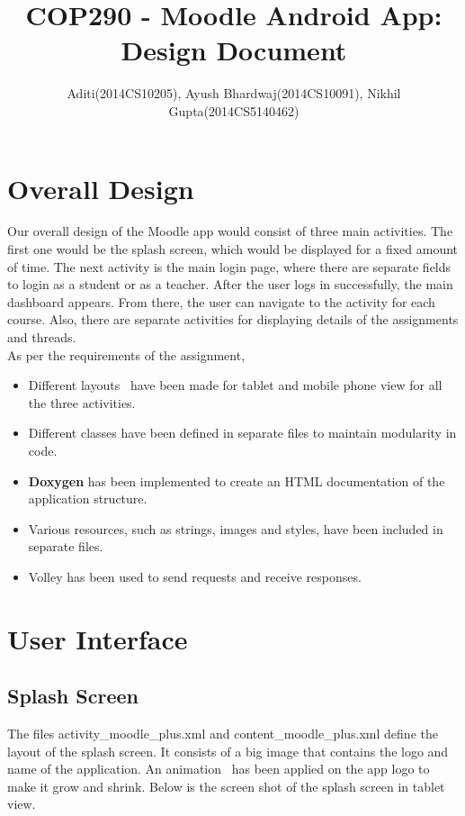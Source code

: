 \documentclass{article}
\begin{document}
\title{COP290 - Moodle Android App: Design Document}
\author{ Aditi(2014CS10205), Ayush Bhardwaj(2014CS10091), Nikhil Gupta(2014CS5140462)}

\maketitle

\section{Overall Design}

Our overall design of the Moodle app would consist of three main activities. The first one would be the splash screen, which would be displayed for a fixed amount of time. The next activity is the main login page, where there are separate fields to login as a student or as a teacher. After the user logs in successfully, the main dashboard appears. From there, the user can navigate to the activity for each course. Also, there are separate activities for displaying details of the assignments and threads.\\
As per the requirements of the assignment,
\begin{itemize}
\item Different layouts~\cite{multiple_screen_sizes} have been made for tablet and mobile phone view for all the three activities.
\item Different classes have been defined in separate files to maintain modularity in code.
\item \textbf{Doxygen} has been implemented to create an HTML documentation of the application structure.
\item Various resources, such as strings, images and styles, have been included in separate files.
\item Volley has been used to send requests and receive responses.
\end{itemize} 

\section{User Interface}
\subsection{Splash Screen} The files activity\_moodle\_plus.xml and content\_moodle\_plus.xml define the layout of the splash screen. It consists of a big image that contains the logo and name of the application. An animation~\cite{animations} has been applied on the app logo to make it grow and shrink. Below is the screen shot of the splash screen in tablet view. 
\end{document}

